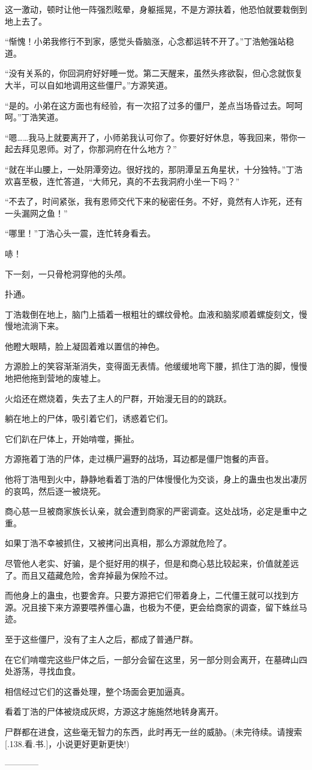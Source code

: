 \begin{this_body}
这一激动，顿时让他一阵强烈眩晕，身躯摇晃，不是方源扶着，他恐怕就要栽倒到地上去了。

“惭愧！小弟我修行不到家，感觉头昏脑涨，心念都运转不开了。”丁浩勉强站稳道。

“没有关系的，你回洞府好好睡一觉。第二天醒来，虽然头疼欲裂，但心念就恢复大半，可以自如地调用这些僵尸。”方源笑道。

“是的。小弟在这方面也有经验，有一次招了过多的僵尸，差点当场昏过去。呵呵呵。”丁浩笑道。

“嗯……我马上就要离开了，小师弟我认可你了。你要好好休息，等我回来，带你一起去拜见恩师。对了，你那洞府在什么地方？”

“就在半山腰上，一处阴潭旁边。很好找的，那阴潭呈五角星状，十分独特。”丁浩欢喜至极，连忙答道，“大师兄，真的不去我洞府小坐一下吗？”

“不去了，时间紧张，我有恩师交代下来的秘密任务。不好，竟然有人诈死，还有一头漏网之鱼！”

“哪里！”丁浩心头一震，连忙转身看去。

哧！

下一刻，一只骨枪洞穿他的头颅。

扑通。

丁浩栽倒在地上，脑门上插着一根粗壮的螺纹骨枪。血液和脑浆顺着螺旋刻文，慢慢地流淌下来。

他瞪大眼睛，脸上凝固着难以置信的神色。

方源脸上的笑容渐渐消失，变得面无表情。他缓缓地弯下腰，抓住丁浩的脚，慢慢地把他拖到营地的废墟上。

火焰还在燃烧着，失去了主人的尸群，开始漫无目的的跳跃。

躺在地上的尸体，吸引着它们，诱惑着它们。

它们趴在尸体上，开始啃噬，撕扯。

方源拖着丁浩的尸体，走过横尸遍野的战场，耳边都是僵尸饱餐的声音。

他将丁浩甩到火中，静静地看着丁浩的尸体慢慢化为交谈，身上的蛊虫也发出凄厉的哀鸣，然后逐一被烧死。

商心慈一旦被商家族长认亲，就会遭到商家的严密调查。这处战场，必定是重中之重。

如果丁浩不幸被抓住，又被拷问出真相，那么方源就危险了。

尽管他人老实、好骗，是个挺好用的棋子，但是和商心慈比较起来，价值就差远了。而且又蕴藏危险，舍弃掉最为保险不过。

而他身上的蛊虫，也要舍弃。只要方源把它们带着身上，二代僵王就可以找到方源。况且接下来方源要喂养僵心蛊，也极为不便，更会给商家的调查，留下蛛丝马迹。

至于这些僵尸，没有了主人之后，都成了普通尸群。

在它们啃噬完这些尸体之后，一部分会留在这里，另一部分则会离开，在墓碑山四处游荡，寻找血食。

相信经过它们的这番处理，整个场面会更加逼真。

看着丁浩的尸体被烧成灰烬，方源这才施施然地转身离开。

尸群都在进食，这些毫无智力的东西，此时再无一丝的威胁。(未完待续。请搜索[.138.看.书.]，小说更好更新更快!)

------------

\end{this_body}

